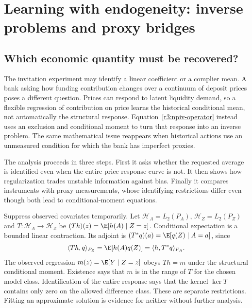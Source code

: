 \chapter{Learning with endogeneity: inverse problems and proxy bridges}
\label{r3:inverse-learning}
\section{Which economic quantity must be recovered?}
The invitation experiment may identify a linear coefficient or a complier
mean. A bank asking how funding contribution changes over a continuum of
deposit prices poses a different question. Prices can respond to latent
liquidity demand, so a flexible regression of contribution on price learns
the historical conditional mean, not automatically the structural response.
Equation~\eqref{r3:npiv-operator} instead uses an exclusion and conditional
moment to turn that response into an inverse problem. The same mathematical
issue reappears when historical actions use an unmeasured condition for
which the bank has imperfect proxies.

The analysis proceeds in three steps. First it asks whether the requested
average is identified even when the entire price-response curve is not.
It then shows how regularization trades unstable information against bias.
Finally it compares instruments with proxy measurements, whose identifying
restrictions differ even though both lead to conditional-moment equations.

Suppress observed covariates temporarily. Let
$\mathcal H_A=L_2(P_A)$, $\mathcal H_Z=L_2(P_Z)$ and
$T:\mathcal H_A\to\mathcal H_Z$ be
$(Th)(z)=\E[h(A)\mid Z=z]$. Conditional expectation is a bounded
linear contraction. Its adjoint is
$(T^*q)(a)=\E[q(Z)\mid A=a]$, since
\[
 \langle Th,q\rangle_{P_Z}
 =\E[h(A)q(Z)]=\langle h,T^*q\rangle_{P_A}.
\]
The observed regression $m(z)=\E[Y\mid Z=z]$ obeys $Th=m$ under
the structural conditional moment. Existence says that $m$ is in the
range of $T$ for the chosen model class. Identification of the entire
response says that the kernel $\ker T$ contains only zero on the
allowed difference class. These are separate restrictions. Fitting
an approximate solution is evidence for neither without further analysis.

